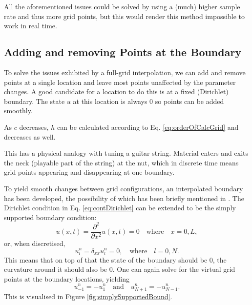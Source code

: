 \documentclass[dvipsnames, preprint]{JASA}
\begin{document}
All the aforementioned issues could be solved by using a (much) higher sample rate and thus more grid points, but this would render this method impossible to work in real time.

\subsection{Adding and removing Points at the Boundary}\label{sec:addAtBoundary}
To solve the issues exhibited by a full-grid interpolation, we can add and remove points at a single location and leave most points unaffected by the parameter changes. A good candidate for a location to do this is at a fixed (Dirichlet) boundary. The state $u$ at this location is always $0$ so points can be added smoothly. 

As $c$ decreases, $h$ can be calculated according to Eq. \eqref{eq:orderOfCalcGrid} and decreases as well.

This has a physical analogy with tuning a guitar string. Material enters and exits the neck (playable part of the string) at the nut, which in discrete time means grid points appearing and disappearing at one boundary.

To yield smooth changes between grid configurations, an interpolated boundary has been developed, the possibility of which has been briefly mentioned in \cite[p. 145]{bilbao2009}. The Dirichlet condition in Eq. \eqref{eq:contDirichlet} can be extended to be the simply supported boundary condition:
\begin{equation}
    u(x, t) = \frac{\partial^2}{\partial x^2}u(x, t) = 0 \quad \text{where} \quad x = 0, L,
\end{equation}
or, when discretised,
\begin{equation}
    u_l^n = \delta_{xx}u_l^n = 0, \quad \text{where} \quad l = 0, N.
\end{equation}
This means that on top of that the state of the boundary should be $0$, the curvature around it should also be $0$. One can again solve for the virtual grid points at the boundary locations, yielding
\begin{equation}
    u_{-1}^n = -u_1^n \quad \text{and} \quad u_{N+1}^n = -u_{N-1}^n.
\end{equation}
This is visualised in Figure \ref{fig:simplySupportedBound}.
\end{document}
